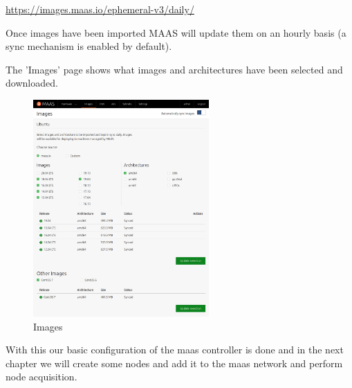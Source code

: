 \url{https://images.maas.io/ephemeral-v3/daily/}

Once images have been imported MAAS will update them on an hourly basis (a sync mechanism is enabled by default).

The 'Images' page shows what images and architectures have been selected and downloaded.

\begin{figure}[!ht]
    \centering
    \includegraphics[width=0.6\textwidth]{images/4-11.png}
    \caption{Images}
\end{figure}


With this our basic configuration of the maas controller is done and in the next chapter we will create some nodes and add it to the maas network and perform node acquisition.